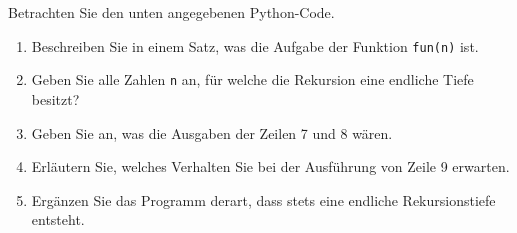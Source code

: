 Betrachten Sie den unten angegebenen Python-Code.
\begin{enumerate}
	\item Beschreiben Sie in einem Satz, was die Aufgabe der Funktion \verb|fun(n)| ist.
	\item Geben Sie alle Zahlen \verb|n| an, für welche die Rekursion eine endliche Tiefe besitzt?
	\item Geben Sie an, was die Ausgaben der Zeilen 7 und 8 wären.
	\item Erläutern Sie, welches Verhalten Sie bei der Ausführung von Zeile 9 erwarten. 
	\item Ergänzen Sie das Programm derart, dass stets eine endliche Rekursionstiefe entsteht.
\end{enumerate}

